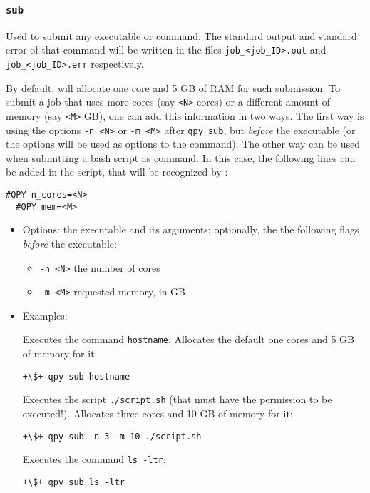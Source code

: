 \documentclass[a4paper,12pt]{article}
\begin{document}
\subsubsection{\texttt{sub}}

Used to submit any executable or command.
The standard output and standard error of that command will be written in the files \texttt{job\_<job\_ID>.out} and \texttt{job\_<job\_ID>.err} respectively.

By default, \qpy{} will allocate one core and 5 GB of RAM for such submission.
To submit a job that uses more cores (say \texttt{<N>} cores) or a different amount of memory (say \texttt{<M>} GB), one can add this information in two ways.
The first way is using the options \texttt{-n <N>} or \texttt{-m <M>} after \texttt{qpy sub}, but \emph{before} the executable (or the options will be used as options to the command).
The other way can be used when submitting a bash script as command.
In this case, the following lines can be added in the script, that will be recognized by \qpy{}:

\begin{lstlisting}[style=FileStyle]
  #QPY n_cores=<N>
  #QPY mem=<M>
\end{lstlisting}

\begin{itemize}
\item Options:
  the executable and its arguments;
  optionally, the the following flags \emph{before} the executable:
  \begin{itemize}
  \item \texttt{-n <N>} \quad   the number of cores
  \item \texttt{-m <M>} \quad   requested memory, in GB
  \end{itemize}
  
\item Examples:

  Executes the command \texttt{hostname}. Allocates the default one cores and 5 GB of memory for it:

\begin{lstlisting}[style=BashStyle]
+\$+ qpy sub hostname
\end{lstlisting}
  
  Executes the script \texttt{./script.sh} (that must have the permission to be executed!). Allocates three cores and 10 GB of memory for it:

\begin{lstlisting}[style=BashStyle]
+\$+ qpy sub -n 3 -m 10 ./script.sh 
\end{lstlisting}
  Executes the command \texttt{ls -ltr}:

\begin{lstlisting}[style=BashStyle]
+\$+ qpy sub ls -ltr
\end{lstlisting}

\end{itemize}
  
\end{document}
